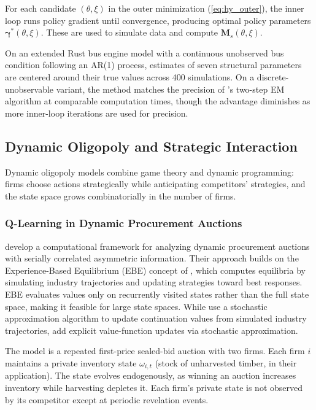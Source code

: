 For each candidate $(\theta, \xi)$ in the outer minimization (\ref{eq:hy_outer}), the inner loop runs policy gradient until convergence, producing optimal policy parameters $\boldsymbol{\gamma}^*(\theta, \xi)$. These are used to simulate data and compute $\mathbf{M}_s(\theta, \xi)$.

On an extended Rust bus engine model with a continuous unobserved bus condition following an AR(1) process, estimates of seven structural parameters are centered around their true values across 400 simulations. On a discrete-unobservable variant, the method matches the precision of \citet{ArcidiaconoMiller2011}'s two-step EM algorithm at comparable computation times, though the advantage diminishes as more inner-loop iterations are used for precision.


\subsection{Dynamic Oligopoly and Strategic Interaction}

Dynamic oligopoly models combine game theory and dynamic programming: firms choose actions strategically while anticipating competitors' strategies, and the state space grows combinatorially in the number of firms.


\subsubsection{Q-Learning in Dynamic Procurement Auctions}

\citet{AskerEtAl2020} develop a computational framework for analyzing dynamic procurement auctions with serially correlated asymmetric information. Their approach builds on the Experience-Based Equilibrium (EBE) concept of \citet{FershtmanPakes2012}, which computes equilibria by simulating industry trajectories and updating strategies toward best responses. EBE evaluates values only on recurrently visited states rather than the full state space, making it feasible for large state spaces. While \citet{FershtmanPakes2012} use a stochastic approximation algorithm to update continuation values from simulated industry trajectories, \citet{AskerEtAl2020} add explicit value-function updates via stochastic approximation.

The model is a repeated first-price sealed-bid auction with two firms. Each firm $i$ maintains a private inventory state $\omega_{i,t}$ (stock of unharvested timber, in their application). The state evolves endogenously, as winning an auction increases inventory while harvesting depletes it. Each firm's private state is not observed by its competitor except at periodic revelation events.

